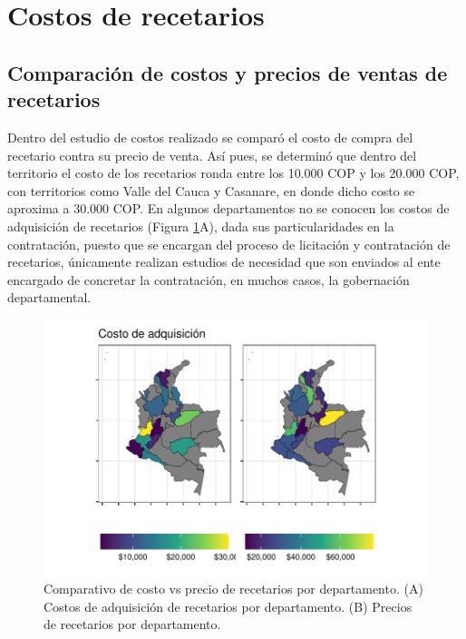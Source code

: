 \documentclass[
]{book}
\begin{document}
\hypertarget{costos-de-recetarios}{%
\section{Costos de recetarios}\label{costos-de-recetarios}}


\hypertarget{comparaciuxf3n-de-costos-y-precios-de-ventas-de-recetarios}{%
\subsection{Comparación de costos y precios de ventas de recetarios}\label{comparaciuxf3n-de-costos-y-precios-de-ventas-de-recetarios}}

Dentro del estudio de costos realizado se comparó el costo de compra del recetario contra su precio de venta. Así pues, se determinó que dentro del territorio el costo de los recetarios ronda entre los 10.000 COP y los 20.000 COP, con territorios como Valle del Cauca y Casanare, en donde dicho costo se aproxima a 30.000 COP. En algunos departamentos no se conocen los costos de adquisición de recetarios (Figura \ref{fig:costoRecetario}A), dada sus particularidades en la contratación, puesto que se encargan del proceso de licitación y contratación de recetarios, únicamente realizan estudios de necesidad que son enviados al ente encargado de concretar la contratación, en muchos casos, la gobernación departamental.

\begin{figure}

{\centering \includegraphics[width=0.9\linewidth]{InformeFinal_files/figure-latex/costoRecetario-1} 

}

\caption{Comparativo de costo vs precio de recetarios por departamento. (A) Costos de adquisición de recetarios por departamento. (B) Precios de recetarios por departamento.}\label{fig:costoRecetario}
\end{figure}
\end{document}
